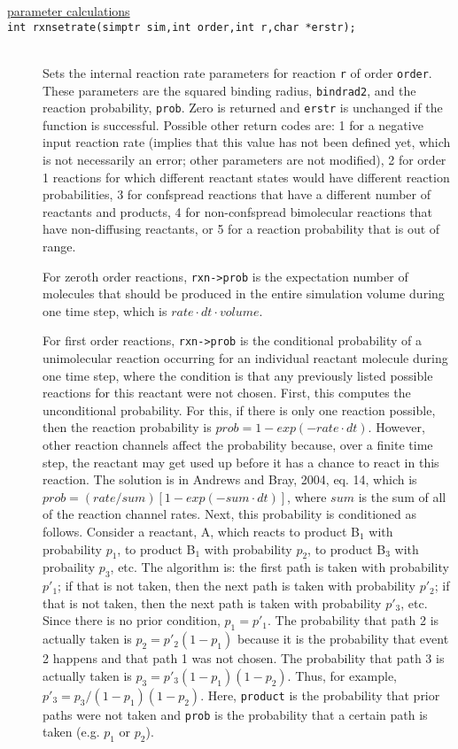\documentclass {book}
\newcommand {\ttt} {\texttt}
\begin{document}
\begin{description}
\item[\underline{parameter calculations}]

\item[\ttt{int rxnsetrate(simptr sim,int order,int r,char *erstr);}]
\hfill \\
Sets the internal reaction rate parameters for reaction \ttt{r} of order \ttt{order}. These parameters are the squared binding radius, \ttt{bindrad2}, and the reaction probability, \ttt{prob}. Zero is returned and \ttt{erstr} is unchanged if the function is successful. Possible other return codes are: 1 for a negative input reaction rate (implies that this value has not been defined yet, which is not necessarily an error; other parameters are not modified), 2 for order 1 reactions for which different reactant states would have different reaction probabilities, 3 for confspread reactions that have a different number of reactants and products, 4 for non-confspread bimolecular reactions that have non-diffusing reactants, or 5 for a reaction probability that is out of range.

For zeroth order reactions, \ttt{rxn->prob} is the expectation number of molecules that should be produced in the entire simulation volume during one time step, which is $rate \cdot dt \cdot volume$.

For first order reactions, \ttt{rxn->prob} is the conditional probability of a unimolecular reaction occurring for an individual reactant molecule during one time step, where the condition is that any previously listed possible reactions for this reactant were not chosen. First, this computes the unconditional probability. For this, if there is only one reaction possible, then the reaction probability is $prob=1-exp(-rate \cdot dt)$. However, other reaction channels affect the probability because, over a finite time step, the reactant may get used up before it has a chance to react in this reaction. The solution is in Andrews and Bray, 2004, eq. 14, which is $prob=(rate/sum)[1-exp(-sum \cdot dt)]$, where $sum$ is the sum of all of the reaction channel rates. Next, this probability is conditioned as follows. Consider a reactant, A, which reacts to product B$_1$ with probability $p_{1}$, to product B$_1$ with probability $p_2$, to product B$_3$ with probaility $p_3$, etc. The algorithm is: the first path is taken with probability $p'_1$; if that is not taken, then the next path is taken with probability $p'_2$; if that is not taken, then the next path is taken with probability $p'_3$, etc. Since there is no prior condition, $p_1=p'_1$. The probability that path 2 is actually taken is $p_2=p'_{2}(1-p_1)$ because it is the probability that event 2 happens and that path 1 was not chosen. The probability that path 3 is actually taken is $p_3=p'_{3}(1-p_1)(1-p_2)$. Thus, for example, $p'_3=p_3/(1-p_1)(1-p_2)$. Here, \ttt{product} is the probability that prior paths were not taken and \ttt{prob} is the probability that a certain path is taken (e.g. $p_1$ or $p_2$).


\end{description}
\end{document}
